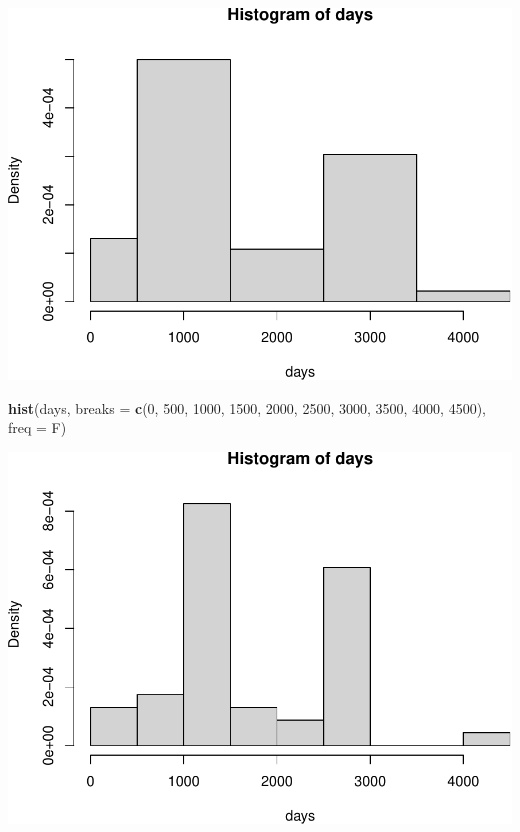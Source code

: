 \documentclass[
]{book}
\newenvironment{Shaded}{\begin{snugshade}}{\end{snugshade}}
\newcommand{\AttributeTok}[1]{\textcolor[rgb]{0.13,0.29,0.53}{#1}}
\newcommand{\DecValTok}[1]{\textcolor[rgb]{0.00,0.00,0.81}{#1}}
\newcommand{\FunctionTok}[1]{\textcolor[rgb]{0.13,0.29,0.53}{\textbf{#1}}}
\newcommand{\NormalTok}[1]{#1}
\begin{document}
\begin{center}\includegraphics[width=0.8\linewidth]{_main_files/figure-latex/unnamed-chunk-3-1} \end{center}

\begin{Shaded}
\begin{Highlighting}[]
\FunctionTok{hist}\NormalTok{(days, }\AttributeTok{breaks =} \FunctionTok{c}\NormalTok{(}\DecValTok{0}\NormalTok{, }\DecValTok{500}\NormalTok{, }\DecValTok{1000}\NormalTok{, }\DecValTok{1500}\NormalTok{, }\DecValTok{2000}\NormalTok{, }\DecValTok{2500}\NormalTok{, }\DecValTok{3000}\NormalTok{, }\DecValTok{3500}\NormalTok{, }\DecValTok{4000}\NormalTok{, }\DecValTok{4500}\NormalTok{), }\AttributeTok{freq =}\NormalTok{ F)}
\end{Highlighting}
\end{Shaded}

\begin{center}\includegraphics[width=0.8\linewidth]{_main_files/figure-latex/unnamed-chunk-3-2} \end{center}
\end{document}
